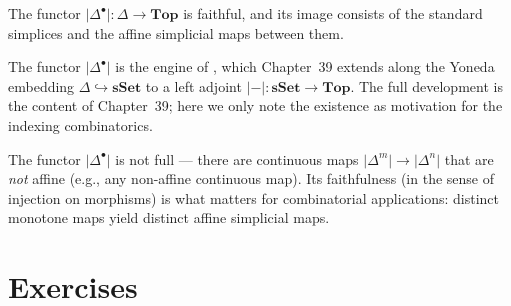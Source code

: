 \begin{theorem}
\label{thm:delta-faithful}
The functor $\lvert\Delta^\bullet\rvert : \Delta \to \mathbf{Top}$ is
faithful, and its image consists of the standard simplices and the
affine simplicial maps between them.
\end{theorem}

The functor $\lvert\Delta^\bullet\rvert$ is the engine of , which Chapter~39 extends along the Yoneda embedding
$\Delta \hookrightarrow \mathbf{sSet}$ to a left adjoint
$\lvert{-}\rvert : \mathbf{sSet} \to \mathbf{Top}$. The full development
is the content of Chapter~39; here we only note the existence as
motivation for the indexing combinatorics.

\begin{readernote}
The functor $\lvert\Delta^\bullet\rvert$ is not full — there are continuous
maps $\lvert\Delta^m\rvert \to \lvert\Delta^n\rvert$ that are \emph{not}
affine (e.g., any non-affine continuous map). Its faithfulness (in the
sense of injection on morphisms) is what matters for combinatorial
applications: distinct monotone maps yield distinct affine simplicial
maps.
\end{readernote}


\section{Exercises}
\label{sec:simplex-exercises}

